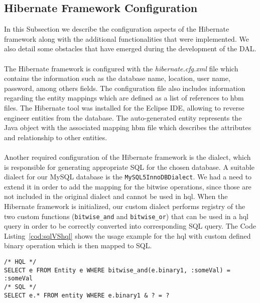 \subsection{Hibernate Framework Configuration}
\label{subsubsec:hfc}
In this Subsection we describe the configuration aspects of the Hibernate framework along with the additional functionalities that were implemented. We also detail some obstacles that have emerged during the development of the DAL.\\
\\
The Hibernate framework is configured with the \emph{hibernate.cfg.xml} file which contains the information such as the database name, location, user name, password, among others fields. The configuration file also includes information regarding the entity mappings which are defined as a list of references to \gls{hbm} files. The Hibernate tool was installed for the Eclipse IDE, allowing to reverse engineer entities from the database. The auto-generated entity represents the Java object with the associated mapping \gls{hbm} file which describes the attributes and relationship to other entities.\\
\\
Another required configuration of the Hibernate framework is the dialect, which is responsible for generating appropriate SQL for the chosen database. A suitable dialect for our MySQL database is the \verb"MySQL5InnoDBDialect". We had a need to extend it in order to add the mapping for the bitwise operations, since those are not included in the original dialect and cannot be used in \gls{hql}. When the Hibernate framework is initialized, our custom dialect performs registry of the two custom functions (\verb"bitwise_and" and \verb"bitwise_or") that can be used in a \gls{hql} query in order to be correctly converted into corresponding SQL query. The Code Listing~\ref{cod:sqlVShql} shows the usage example for the \gls{hql} with custom defined binary operation which is then mapped to SQL.

\lstset{language=SQL} 
\begin{lstlisting}[frame=single,caption={SQL mapped from HQL.}, label={cod:sqlVShql}, frame=bt]
/* HQL */
SELECT e FROM Entity e WHERE bitwise_and(e.binary1, :someVal) = :someVal
/* SQL */
SELECT e.* FROM entity WHERE e.binary1 & ? = ?
\end{lstlisting}
